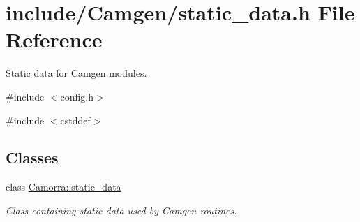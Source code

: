 \hypertarget{a00629}{
\section{include/Camgen/static\_\-data.h File Reference}
\label{a00629}
}


Static data for Camgen modules.  


{\ttfamily \#include $<$config.h$>$}\par
{\ttfamily \#include $<$cstddef$>$}\par
\subsection*{Classes}
\begin{DoxyCompactItemize}
\item 
class \hyperlink{a00497}{Camorra::static\_\-data}
\begin{DoxyCompactList}\small\item\em Class containing static data used by Camgen routines. \end{DoxyCompactList}\end{DoxyCompactItemize}

